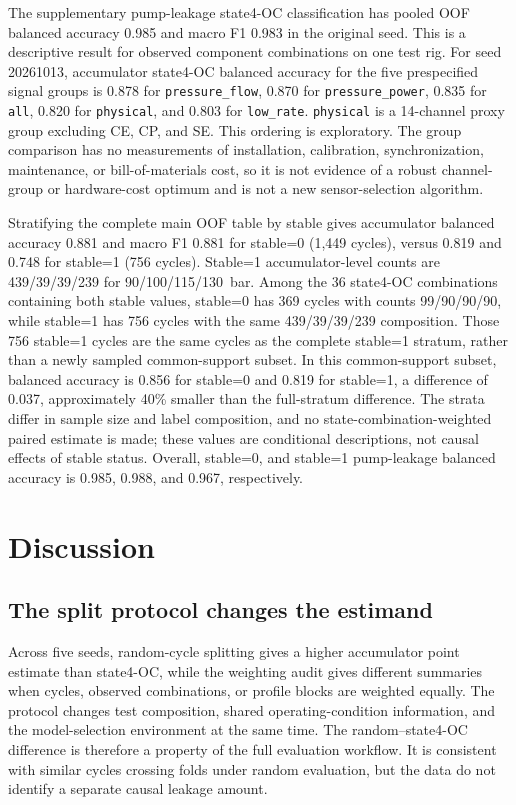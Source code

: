 \documentclass[11pt,a4paper]{article}
\newcommand{\code}[1]{\texttt{#1}}
\begin{document}
The supplementary pump-leakage state4-OC classification has pooled OOF balanced accuracy 0.985 and macro F1 0.983 in the original seed. This is a descriptive result for observed component combinations on one test rig. For seed 20261013, accumulator state4-OC balanced accuracy for the five prespecified signal groups is 0.878 for \code{pressure\_flow}, 0.870 for \code{pressure\_power}, 0.835 for \code{all}, 0.820 for \code{physical}, and 0.803 for \code{low\_rate}. \code{physical} is a 14-channel proxy group excluding CE, CP, and SE. This ordering is exploratory. The group comparison has no measurements of installation, calibration, synchronization, maintenance, or bill-of-materials cost, so it is not evidence of a robust channel-group or hardware-cost optimum and is not a new sensor-selection algorithm.

Stratifying the complete main OOF table by stable gives accumulator balanced accuracy 0.881 and macro F1 0.881 for stable=0 (1,449 cycles), versus 0.819 and 0.748 for stable=1 (756 cycles). Stable=1 accumulator-level counts are 439/39/39/239 for 90/100/115/130~bar. Among the 36 state4-OC combinations containing both stable values, stable=0 has 369 cycles with counts 99/90/90/90, while stable=1 has 756 cycles with the same 439/39/39/239 composition. Those 756 stable=1 cycles are the same cycles as the complete stable=1 stratum, rather than a newly sampled common-support subset. In this common-support subset, balanced accuracy is 0.856 for stable=0 and 0.819 for stable=1, a difference of 0.037, approximately 40\% smaller than the full-stratum difference. The strata differ in sample size and label composition, and no state-combination-weighted paired estimate is made; these values are conditional descriptions, not causal effects of stable status. Overall, stable=0, and stable=1 pump-leakage balanced accuracy is 0.985, 0.988, and 0.967, respectively.

\section{Discussion}
\subsection{The split protocol changes the estimand}
Across five seeds, random-cycle splitting gives a higher accumulator point estimate than state4-OC, while the weighting audit gives different summaries when cycles, observed combinations, or profile blocks are weighted equally. The protocol changes test composition, shared operating-condition information, and the model-selection environment at the same time. The random--state4-OC difference is therefore a property of the full evaluation workflow. It is consistent with similar cycles crossing folds under random evaluation, but the data do not identify a separate causal leakage amount.
\end{document}
